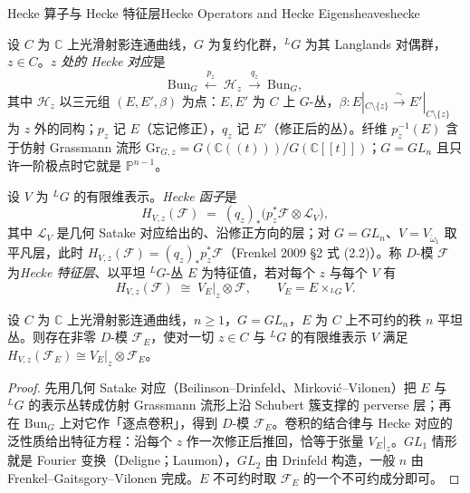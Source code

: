 
\begin{centry}{Hecke 算子与 Hecke 特征层}{Hecke Operators and Hecke Eigensheaves}{hecke}

\begin{definition}
设 $C$ 为 $\mathbb{C}$ 上光滑射影连通曲线，$G$ 为复约化群，${}^{L}G$ 为其 Langlands 对偶群，$z\in C$。\emph{$z$ 处的 Hecke 对应}是
\[
\mathrm{Bun}_G\ \xleftarrow{\ p_z\ }\ \mathcal{H}_{z}\ \xrightarrow{\ q_z\ }\ \mathrm{Bun}_G ,
\]
其中 $\mathcal{H}_{z}$ 以三元组 $(E,E',\beta)$ 为点：$E,E'$ 为 $C$ 上 $G$-丛，$\beta:E|_{C\setminus\{z\}}\xrightarrow{\ \sim\ }E'|_{C\setminus\{z\}}$ 为 $z$ 外的同构；$p_z$ 记 $E$（忘记修正），$q_z$ 记 $E'$（修正后的丛）。纤维 $p_z^{-1}(E)$ 含于仿射 Grassmann 流形 $\mathrm{Gr}_{G,z}=G(\mathbb{C}(\!(t)\!))/G(\mathbb{C}[[t]])$；$G=GL_n$ 且只许一阶极点时它就是 $\mathbb{P}^{n-1}$。

设 $V$ 为 ${}^{L}G$ 的有限维表示。\emph{Hecke 函子}是
\[
H_{V,z}(\mathcal{F})\;=\;(q_z)_{*}\bigl(p_z^{*}\mathcal{F}\otimes\mathcal{L}_{V}\bigr),
\]
其中 $\mathcal{L}_{V}$ 是几何 Satake 对应给出的、沿修正方向的层；对 $G=GL_n$、$V=V_{\check\omega_1}$ 取平凡层，此时 $H_{V,z}(\mathcal{F})=(q_z)_{*}p_z^{*}\mathcal{F}$（Frenkel 2009 §2 式 (2.2)）。称 $D$-模 $\mathcal{F}$ 为\emph{Hecke 特征层}、以平坦 ${}^{L}G$-丛 $E$ 为特征值，若对每个 $z$ 与每个 $V$ 有
\[
H_{V,z}(\mathcal{F})\;\cong\;V_{E}|_{z}\otimes\mathcal{F},\qquad V_{E}=E\times_{{}^{L}G}V .
\]
\end{definition}

\begin{theorem}
设 $C$ 为 $\mathbb{C}$ 上光滑射影连通曲线，$n\ge1$，$G=GL_n$，$E$ 为 $C$ 上不可约的秩 $n$ 平坦丛。则存在非零 $D$-模 $\mathcal{F}_{E}$，使对一切 $z\in C$ 与 ${}^{L}G$ 的有限维表示 $V$ 满足 $H_{V,z}(\mathcal{F}_{E})\cong V_{E}|_{z}\otimes\mathcal{F}_{E}$。
\end{theorem}
\begin{proof}
先用几何 Satake 对应（Beilinson--Drinfeld、Mirkovi\'c--Vilonen）把 $E$ 与 ${}^{L}G$ 的表示丛转成仿射 Grassmann 流形上沿 Schubert 簇支撑的 perverse 层；再在 $\mathrm{Bun}_G$ 上对它作「逐点卷积」，得到 $D$-模 $\mathcal{F}_{E}$。卷积的结合律与 Hecke 对应的泛性质给出特征方程：沿每个 $z$ 作一次修正后推回，恰等于张量 $V_{E}|_{z}$。$GL_1$ 情形就是 Fourier 变换（Deligne；Laumon），$GL_2$ 由 Drinfeld 构造，一般 $n$ 由 Frenkel--Gaitsgory--Vilonen 完成。$E$ 不可约时取 $\mathcal{F}_{E}$ 的一个不可约成分即可。
\end{proof}


\end{centry}
